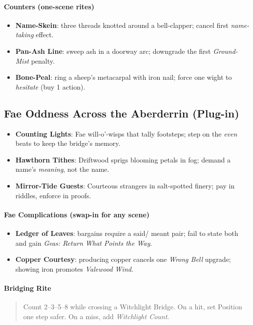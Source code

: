 \paragraph{Counters (one-scene rites)}
\begin{itemize}
  \item \textbf{Name-Skein}: three threads knotted around a bell-clapper; cancel first \emph{name-taking} effect.
  \item \textbf{Pan-Ash Line}: sweep ash in a doorway arc; downgrade the first \emph{Ground-Mist} penalty.
  \item \textbf{Bone-Peal}: ring a sheep’s metacarpal with iron nail; force one wight to \emph{hesitate} (buy 1 action).
\end{itemize}

\subsection*{Fae Oddness Across the Aberderrin (Plug-in)}
\begin{itemize}
  \item \textbf{Counting Lights}: Fae will-o’-wisps that tally footsteps; step on the \emph{even} beats to keep the bridge’s memory.
  \item \textbf{Hawthorn Tithes}: Driftwood sprigs blooming petals in fog; demand a name’s \emph{meaning}, not the name.
  \item \textbf{Mirror-Tide Guests}: Courteous strangers in salt-spotted finery; pay in riddles, enforce in proofs.
\end{itemize}

\paragraph{Fae Complications (swap-in for any scene)}
\begin{itemize}
  \item \textbf{Ledger of Leaves}: bargains require a said/ meant pair; fail to state both and gain \emph{Geas: Return What Points the Way}.
  \item \textbf{Copper Courtesy}: producing copper cancels one \emph{Wrong Bell} upgrade; showing iron promotes \emph{Valewood Wind}.
\end{itemize}

\paragraph{Bridging Rite}
\begin{quote}
Count 2–3–5–8 while crossing a Witchlight Bridge. On a hit, set Position one step safer. On a miss, add \emph{Witchlight Count}.
\end{quote}

